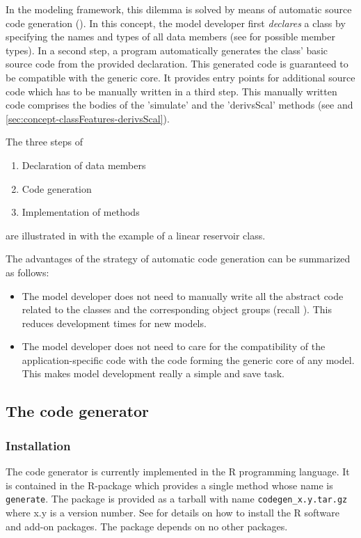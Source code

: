In the  modeling framework, this dilemma is solved by means of automatic source code generation (). In this concept, the model developer first \emph{declares} a class by specifying the names and types of all data members (see  for possible member types). In a second step, a program automatically generates the class' basic source code from the provided declaration. This generated code is guaranteed to be compatible with the generic core. It provides entry points for additional source code which has to be manually written in a third step. This manually written code comprises the bodies of the 'simulate' and the 'derivsScal' methods (see  and \ref{sec:concept-classFeatures-derivsScal}).

The three steps of
\begin{enumerate}
  \item Declaration of data members
  \item Code generation
  \item Implementation of methods
\end{enumerate}
are illustrated in  with the example of a linear reservoir class.

The advantages of the strategy of automatic code generation can be summarized as follows:
\begin{itemize}
  \item The model developer does not need to manually write all the abstract code related to the classes and the corresponding object groups (recall ). This reduces development times for new models.
  \item The model developer does not need to care for the compatibility of the application-specific code with the code forming the generic core of any  model. This makes model development really a simple and save task.
\end{itemize}

\subsection{The code generator} \label{sec:concept-autocode-codegen-basic}


\subsubsection*{Installation}
The code generator is currently implemented in the R programming language. It is contained in the R-package  which provides a single method whose name is \texttt{generate}. The package is provided as a tarball with name \verb!codegen_x.y.tar.gz! where x.y is a version number. See \citet{Echse-Install-Doc} for details on how to install the R software and add-on packages. The  package depends on no other packages.


